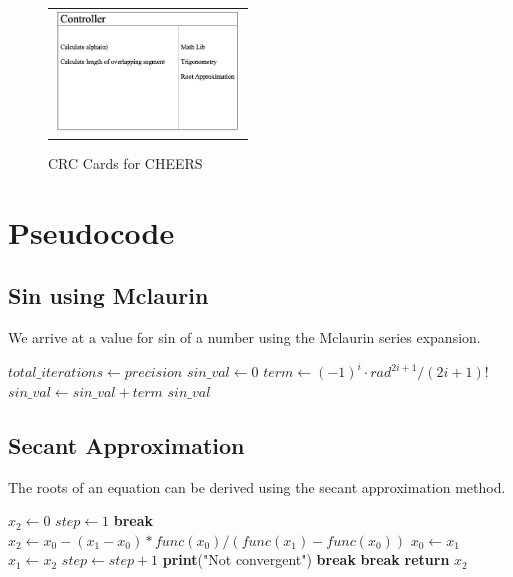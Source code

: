 \documentclass{report}
\begin{document}
\begin{figure}[h!]
      \begin{tabular}{@{}c@{}}
        \includegraphics[width=.4\linewidth,height=90pt]{resources/Controller.png}
      \end{tabular}

      \vspace{\floatsep}
    \caption{CRC Cards for CHEERS}\label{fig:myfig}
\end{figure}

\chapter{Pseudocode}
\section{Sin using Mclaurin}
\begin{flushleft}
We arrive at a value for sin of a number using the Mclaurin series expansion.
\end{flushleft}
\begin{algorithmic}[1]
        \State $total\_iterations \gets precision$
        \State $sin\_val \gets 0$
            \State $term \gets (-1)^i \cdot rad^{2i + 1} / (2i + 1)!$
            \State $sin\_val \gets sin\_val + term$
        \EndFor
        \State \Return $sin\_val$
    \EndFunction
\end{algorithmic}

\section{Secant Approximation}
\begin{flushleft}
The roots of an equation can be derived using the secant approximation method.
\end{flushleft}
\begin{algorithmic}[1]
    \State $x_2 \gets 0$
    \State $step \gets 1$
            \State \textbf{break}
        \EndIf
        \State $x_2 \gets x_0 - (x_1 - x_0) * func(x_0) / (func(x_1) - func(x_0))$
        \State $x_0 \gets x_1$
        \State $x_1 \gets x_2$
        \State $step \gets step + 1$
            \State \textbf{print}("Not convergent")
            \State \textbf{break}
        \EndIf
            \State \textbf{break}
        \EndIf
    \EndWhile
    \State \textbf{return} $x_2$
\EndFunction
\end{algorithmic}
\end{document}
